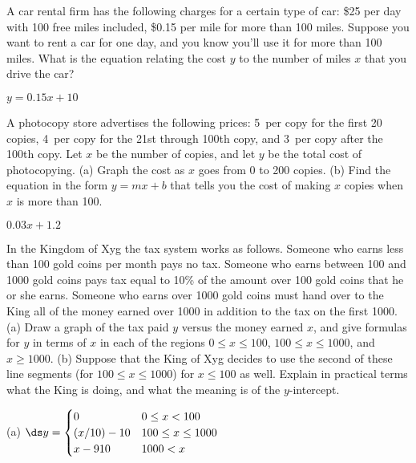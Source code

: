 \begin{exercises}
\begin{exercise}
A car rental firm has the following charges for a certain type of car:
\$25 per day with 100 free miles included, \$0.15 per mile for more than
100 miles.  Suppose you want to rent a car for one day, and you know you'll
use it for more than 100 miles.  What is the equation relating the cost
$y$ to the number of miles $x$ that you drive the car?
\begin{answer} $y=0.15x+10$
\end{answer}\end{exercise}

\begin{exercise} A photocopy store advertises the following prices: 5\cents~per
copy for the first 20 copies, 4\cents~per copy for the 21st through
100th copy, and 3\cents~per copy after the 100th copy.  Let $x$ be the
number of copies, and let $y$ be the total cost of photocopying.  (a)
Graph the cost as $x$ goes from 0 to 200 copies.  (b) Find the
equation in the form $y=mx+b$ that tells you the cost of making $x$
copies when $x$ is more than 100.
\begin{answer} $0.03x+1.2$
\end{answer}\end{exercise}

\begin{exercise}
In the Kingdom of Xyg the tax system works as follows.  Someone who
earns less than 100 gold coins per month pays no tax.  Someone who earns
between 100 and 1000 gold coins pays tax equal to 10\% of the amount over
100 gold coins that he or she earns.  Someone who earns over 1000 gold coins
must hand over to the King all of the money earned over 1000 in addition to
the tax on the first 1000.  (a) Draw a
graph of the tax paid $y$ versus the money earned $x$, and give
formulas for $y$ in terms of $x$ in each of the regions $0\le x\le 100$,
$100\le x\le 1000$, and $x\ge 1000$.  (b) Suppose that the King of Xyg
decides to use the second of these line segments (for $100\le x\le 1000$)
for $x\le 100$ as well.  Explain in practical terms what the King is doing,
and what the meaning is of the $y$-intercept. 
\begin{answer} (a) $\ds y=\begin{cases} 0 & 0\le x<100 \\
(x/10)-10& 100\le x\le 1000 \\
x-910 & 1000<x 
\end{cases}$
\end{answer}\end{exercise}


\end{exercises}
